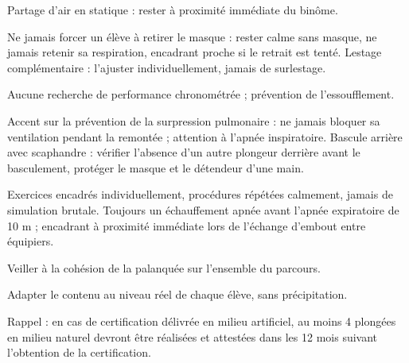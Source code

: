 \begin{description}[leftmargin=0.7cm]
    Partage d'air en statique : rester à proximité immédiate du binôme.
  \item[Séance 7] Ne jamais forcer un élève à retirer le masque : rester calme sans masque, 
    ne jamais retenir sa respiration, encadrant proche si le retrait est tenté. 
    Lestage complémentaire : l'ajuster individuellement, jamais de surlestage.
  \item[Séance 8] Aucune recherche de performance chronométrée ; prévention de
    l'essoufflement.
  \item[Séance 9] Accent sur la prévention de la surpression pulmonaire : ne jamais
    bloquer sa ventilation pendant la remontée ; attention à l'apnée inspiratoire.
    Bascule arrière avec scaphandre : vérifier l'absence d'un autre plongeur derrière
    avant le basculement, protéger le masque et le détendeur d'une main.
  \item[Séance 10] Exercices encadrés individuellement, procédures répétées calmement,
    jamais de simulation brutale. Toujours un échauffement apnée avant l'apnée
    expiratoire de 10 m ; encadrant à proximité immédiate lors de l'échange d'embout
    entre équipiers.
  \item[Séance 11] Veiller à la cohésion de la palanquée sur l'ensemble du parcours.
  \item[Séance 12] Adapter le contenu au niveau réel de chaque élève, sans précipitation.
  \item[Séance 13] Rappel : en cas de certification délivrée en milieu artificiel, au
    moins 4 plongées en milieu naturel devront être réalisées et attestées dans les 12
    mois suivant l'obtention de la certification.
\end{description}
